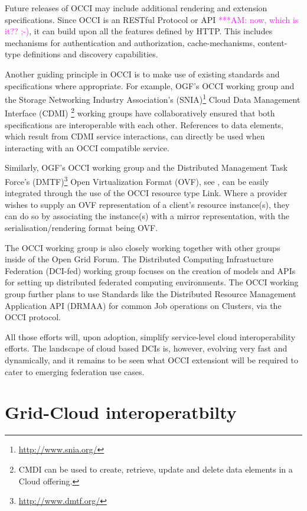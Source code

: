 \documentclass[10pt,conference,final,letterpaper,twoside,twocolumn,]{IEEEtran}
\newcommand{\amnote}[1]{  {\textcolor{magenta} {***AM: #1}}}
\newcommand{\amnote}[1]{}
\begin{document}
 Future releases of OCCI may include additional rendering and
 extension specifications. Since OCCI is an RESTful Protocol or
 API\amnote{now, which is it?? ;-)}, it can build upon all the
 features defined by HTTP. This includes mechanisms for authentication
 and authorization, cache-mechanisms, content-type definitions and
 discovery capabilities.

 Another guiding principle in OCCI is to make use of existing
 standards and specifications where appropriate.  For example, OGF's
 OCCI working group and the Storage Networking Industry Association's
 (SNIA)\footnote{\url{http://www.snia.org/}} Cloud Data Management
 Interface (CDMI) \footnote{CMDI can be used to create, retrieve,
 update and delete data elements in a Cloud offering.} working groups
 have collaboratively ensured that both specifications are
 interoperable with each other. 
 References to data elements, which result from CDMI service
 interactions, can directly be used when interacting with an OCCI
 compatible service.

 Similarly, OGF's OCCI working group and the Distributed Management
 Task Force's (DMTF)\footnote{\url{http://www.dmtf.org/}} Open
 Virtualization Format (OVF), see \cite{CDG+2009}, can be easily
 integrated through the use of the OCCI resource type Link. Where a
 provider wishes to supply an OVF representation of a client's
 resource instance(s), they can do so by associating the instance(s)
 with a mirror representation, with the serialisation/rendering format
 being OVF.

 The OCCI working group is also closely working together with other
 groups inside of the Open Grid Forum. The Distributed Computing
 Infrastucture Federation (DCI-fed) working group focuses on the
 creation of models and APIs for setting up distributed federated
 computing environments. The OCCI working group further plans to use
 Standards like the Distributed Resource Management Application API
 (DRMAA) for common Job operations on Clusters, via the OCCI protocol.

 All those efforts will, upon adoption, simplify service-level cloud
 interoperability efforts.  The landscape of cloud based DCIs is,
 however, evolving very fast and dynamically, and it remains to be
 seen what OCCI extensiont will be required to cater to emerging
 federation use cases.


\section{Grid-Cloud interoperatbilty}
\label{sec:gcinterop}
\end{document}
